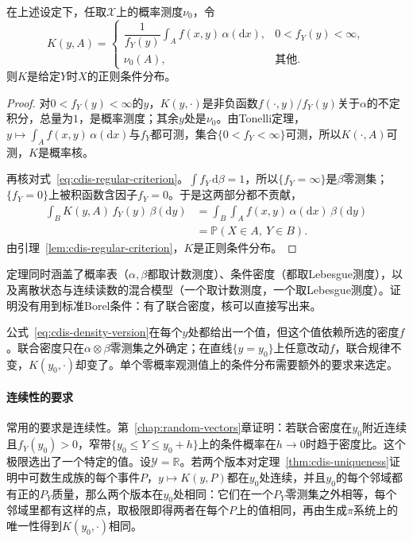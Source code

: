 \begin{theorem}[条件密度给出的正则条件分布]
\label{thm:cdis-density-version}
在上述设定下，任取$\mathcal{X}$上的概率测度$\nu_0$，令
\begin{equation}
 K(y,A)=\begin{cases}
 \dfrac{1}{f_Y(y)}\displaystyle\int_{A}f(x,y)\,\alpha(\mathrm{d}x), & 0<f_Y(y)<\infty,\\
 \nu_0(A), & \text{其他}.
 \end{cases}
 \label{eq:cdis-density-version}
\end{equation}
则$K$是给定$Y$时$X$的正则条件分布。
\end{theorem}

\begin{proof}
对$0<f_Y(y)<\infty$的$y$，$K(y,\cdot)$是非负函数$f(\cdot,y)/f_Y(y)$关于$\alpha$的不定积分，总量为$1$，是概率测度；其余$y$处是$\nu_0$。由Tonelli定理，$y\mapsto\int_{A}f(x,y)\,\alpha(\mathrm{d}x)$与$f_Y$都可测，集合$\{0<f_Y<\infty\}$可测，所以$K(\cdot,A)$可测，$K$是概率核。

再核对式~\eqref{eq:cdis-regular-criterion}。$\int f_Y\,\mathrm{d}\beta=1$，所以$\{f_Y=\infty\}$是$\beta$零测集；$\{f_Y=0\}$上被积函数含因子$f_Y=0$。于是这两部分都不贡献，
\[
 \begin{aligned}
 \int_{B}K(y,A)\,f_Y(y)\,\beta(\mathrm{d}y)&=\int_{B}\int_{A}f(x,y)\,\alpha(\mathrm{d}x)\,\beta(\mathrm{d}y)\\
 &=\mathbb{P}(X\in A,\ Y\in B).
 \end{aligned}
\]
由引理~\ref{lem:cdis-regular-criterion}，$K$是正则条件分布。
\end{proof}

定理同时涵盖了概率表（$\alpha,\beta$都取计数测度）、条件密度（都取Lebesgue测度），以及离散状态与连续读数的混合模型（一个取计数测度，一个取Lebesgue测度）。证明没有用到标准Borel条件：有了联合密度，核可以直接写出来。

公式~\eqref{eq:cdis-density-version}在每个$y$处都给出一个值，但这个值依赖所选的密度$f$。联合密度只在$\alpha\otimes\beta$零测集之外确定；在直线$\{y=y_0\}$上任意改动$f$，联合规律不变，$K(y_0,\cdot)$却变了。单个零概率观测值上的条件分布需要额外的要求来选定。

\paragraph{连续性的要求}
常用的要求是连续性。第~\ref{chap:random-vectors}章证明：若联合密度在$y_0$附近连续且$f_Y(y_0)>0$，窄带$\{y_0\leq Y\leq y_0+h\}$上的条件概率在$h\to0$时趋于密度比。这个极限选出了一个特定的值。设$\mathcal{Y}=\mathbb{R}$。若两个版本对定理~\ref{thm:cdis-uniqueness}证明中可数生成族的每个事件$P$，$y\mapsto K(y,P)$都在$y_0$处连续，并且$y_0$的每个邻域都有正的$P_Y$质量，那么两个版本在$y_0$处相同：它们在一个$P_Y$零测集之外相等，每个邻域里都有这样的点，取极限即得两者在每个$P$上的值相同，再由生成$\pi$系统上的唯一性得到$K(y_0,\cdot)$相同。

